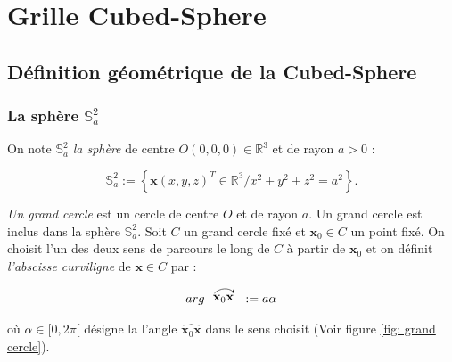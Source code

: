 
\chapter{Grille Cubed-Sphere}

\section{Définition géométrique de la Cubed-Sphere}

\subsection{La sphère $\mathbb{S}_a^2$}

On note $\mathbb{S}_a^2$ \textit{la sphère} de centre $O (0,0,0) \in \mathbb{R}^3$ et de rayon $a>0$ :

\begin{equation}
\mathbb{S}_a^2 := \left\lbrace
\mathbf{x} (x,y,z)^T \in \mathbb{R}^3 / x^2+y^2+z^2 = a^2
\right\rbrace.
\end{equation} 

\textit{Un grand cercle} est un cercle de centre $O$ et de rayon $a$. Un grand cercle est inclus dans la sphère $\mathbb{S}_a^2$.
Soit $C$ un grand cercle fixé et $\mathbf{x}_0 \in C$ un point fixé. On choisit l'un des deux sens de parcours le long de $C$ à partir de $\mathbf{x}_0$ et on définit \textit{l'abscisse curviligne} de $\mathbf{x} \in C$ par :

\begin{equation}
arg \longarc{\mathbf{x}_0  \mathbf{x}} := a \alpha
\end{equation}

où $\alpha \in [ 0, 2 \pi[$ désigne la l'angle $\widehat{\mathbf{x}_0  \mathbf{x}}$ dans le sens choisit (Voir figure \ref{fig: grand cercle}).

